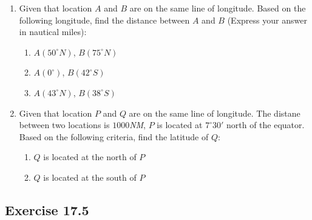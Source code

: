 \documentclass{report}
\begin{document}
\begin{multicols}{2}
    \begin{enumerate}
        \item Given that location $A$ and $B$ are on the same line of longitude. Based on the
              following longitude, find the distance between $A$ and $B$ (Express your answer
              in nautical miles):
              \begin{enumerate}
                  \item $A(50^\circ N)$, $B(75^\circ N)$
                  \item $A(0^\circ)$, $B(42^\circ S)$
                  \item $A(43^\circ N)$, $B(38^\circ S)$
              \end{enumerate}
        \item Given that location $P$ and $Q$ are on the same line of longitude. The distane
              between two locations is $1000$\emph{NM}, $P$ is located at $7^\circ 30'$ north
              of the equator. Based on the following criteria, find the latitude of $Q$:
              \begin{enumerate}
                  \item $Q$ is located at the north of $P$
                  \item $Q$ is located at the south of $P$
              \end{enumerate}
    \end{enumerate}

    \subsection{Exercise 17.5}


\end{multicols}
\end{document}
